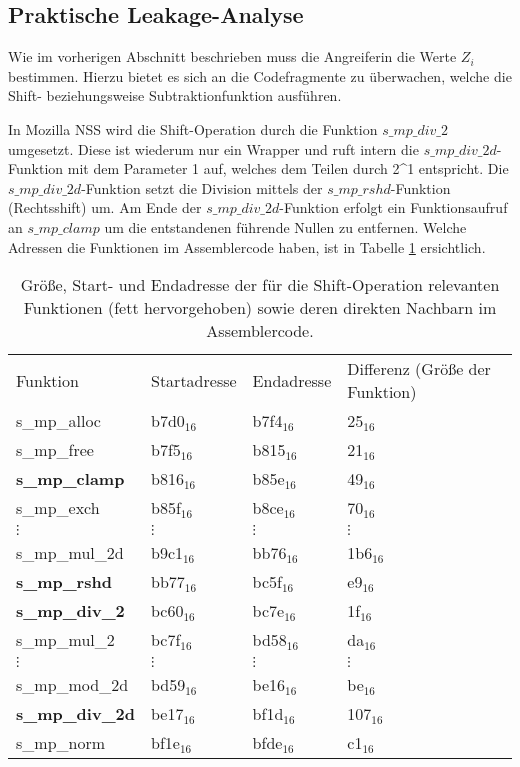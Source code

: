 \subsection{Praktische Leakage-Analyse}

Wie im vorherigen Abschnitt beschrieben muss die Angreiferin die Werte $Z_i$ bestimmen.
Hierzu bietet es sich an die Codefragmente zu überwachen, welche die Shift- beziehungsweise Subtraktionfunktion ausführen.

In Mozilla NSS wird die Shift-Operation durch die Funktion $s\_mp\_div\_2$ umgesetzt.
Diese ist wiederum nur ein Wrapper und ruft intern die $s\_mp\_div\_2d$-Funktion mit dem Parameter 1 auf, welches dem Teilen durch 2^1 entspricht.
Die $s\_mp\_div\_2d$-Funktion setzt die Division mittels der $s\_mp\_rshd$-Funktion (Rechtsshift) um. 
Am Ende der $s\_mp\_div\_2d$-Funktion erfolgt ein Funktionsaufruf an $s\_mp\_clamp$ um die entstandenen führende Nullen zu entfernen.
Welche Adressen die Funktionen im Assemblercode haben, ist in Tabelle \ref{tbl:assOffsetShift} ersichtlich. 

\begin{table}[h]
\label{tbl:assOffsetShift}
\caption{Größe, Start- und Endadresse der für die Shift-Operation relevanten Funktionen (fett hervorgehoben) sowie deren direkten Nachbarn im Assemblercode.}
\begin{tabular}{llll}
Funktion       & Startadresse & Endadresse & Differenz (Größe der Funktion) \\[10pt]
s\_mp\_alloc   & b7d0$_{16}$        & b7f4$_{16}$      & 25$_{16}$   \\
s\_mp\_free    & b7f5$_{16}$        & b815$_{16}$      & 21$_{16}$   \\
\textbf{s\_mp\_clamp}   & b816$_{16}$        & b85e$_{16}$      & 49$_{16}$   \\
s\_mp\_exch    & b85f$_{16}$        & b8ce$_{16}$      & 70$_{16}$   \\
$\vdots$               &  $\vdots$             &    $\vdots$         &     $\vdots$   \\
s\_mp\_mul\_2d & b9c1$_{16}$        & bb76$_{16}$      & 1b6$_{16}$   \\
\textbf{s\_mp\_rshd}    & bb77$_{16}$        & bc5f$_{16}$      & e9$_{16}$   \\
\textbf{s\_mp\_div\_2}  & bc60$_{16}$        & bc7e$_{16}$      & 1f$_{16}$   \\
s\_mp\_mul\_2  & bc7f$_{16}$        & bd58$_{16}$      & da$_{16}$   \\
$\vdots$               &  $\vdots$             &    $\vdots$         &     $\vdots$   \\
s\_mp\_mod\_2d & bd59$_{16}$        & be16$_{16}$      & be$_{16}$   \\
\textbf{s\_mp\_div\_2d} & be17$_{16}$        & bf1d$_{16}$      & 107$_{16}$  \\
s\_mp\_norm    & bf1e$_{16}$        & bfde$_{16}$      & c1$_{16}$  
\end{tabular}
\end{table}

